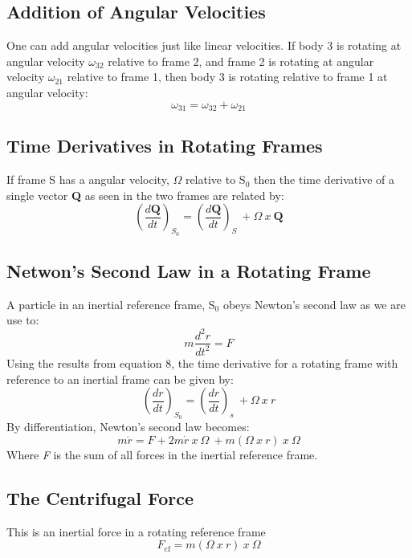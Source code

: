 \documentclass[11pt]{article}
\theoremstyle{definition}
\begin{document}

\subsection*{Addition of Angular Velocities}
One can add angular velocities just like linear velocities. If body 3 is rotating at angular velocity $\omega_{32}$ relative to frame 2, and frame 2 is rotating at angular velocity $\omega_{21}$ relative to frame 1, then body 3 is rotating relative to frame 1 at angular velocity: 
\begin{equation}
\omega_{31} = \omega_{32} + \omega_{21}
\end{equation}
\subsection{Time Derivatives in Rotating Frames}
If frame S has a angular velocity, $\Omega$ relative to S$_0$ then the time derivative of a single vector \textbf{Q} as seen in the two frames are related by:
\begin{equation}
(\frac{d\textbf{Q}}{dt})_{S_0} = (\frac{d\textbf{Q}}{dt})_{S} \ + \Omega \ x \ \textbf{Q}
\end{equation}
\subsection{Netwon's Second Law in a Rotating Frame}
A particle in an inertial reference frame, S$_0$ obeys Newton's second law as we are use to:
\begin{equation}
m\frac{d^2r}{dt^2} = F
\end{equation}
Using the results from equation 8, the time derivative for a rotating frame with reference to an inertial frame can be given by:
\begin{equation}
(\frac{dr}{dt})_{S_0} = (\frac{dr}{dt})_s \ + \Omega \ x \ r
\end{equation}
By differentiation, Newton's second law becomes:
\begin{equation}
m\ddot{r} = F + 2m\dot{r} \ x \ \Omega \ + m(\Omega \ x \ r) \ x \ \Omega
\end{equation}
Where \textit{F} is the sum of all forces in the inertial reference frame. 
\subsection{The Centrifugal Force}
This is an inertial force in a rotating reference frame 
\begin{equation}
F_{\text{cf}} = m(\Omega \ x \ r) \ x \ \Omega
\end{equation}
\end{document}

